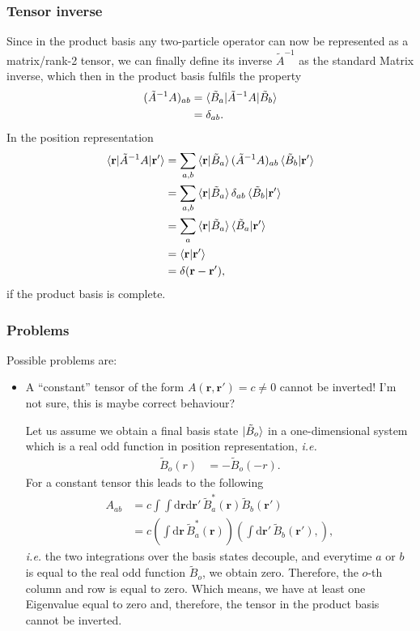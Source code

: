 \documentclass[12pt,a4paper]{scrartcl}
\numberwithin{equation}{section}
\newcommand{\cng}[1]{{\color{red}#1}}
\renewcommand{\vec}{\mathbf}
\begin{document}
\subsubsection{Tensor inverse}

Since in the product basis any two-particle operator can now be
represented as a matrix/rank-2 tensor, we can finally define its inverse $\tilde{A}^{-1}$ as the standard Matrix inverse, which then in the product basis fulfils the property
\begin{align}
 (\tilde{A}^{-1}A)_{ab}
&= \braket{ \tilde{B}_a | \tilde{A}^{-1}A | \tilde{B}_b } \\
&= \delta_{ab}.
\end{align}
In the position representation
\begin{align}
\braket{\vec{r} | \tilde{A}^{-1}A | \vec{r}' }
 &= \sum_{a,b} \braket{\vec{r}|\tilde{B}_a} (\tilde{A}^{-1}A)_{ab}\braket{\tilde{B}_b|\vec{r}'} \\
%
&= \sum_{a,b} \braket{\vec{r}|\tilde{B}_a} \delta_{ab} \braket{\tilde{B}_b|\vec{r}'} \\
&= \sum_{a} \braket{\vec{r}|\tilde{B}_a} \braket{\tilde{B}_a|\vec{r}'} \\
&= \braket{\vec{r}|\vec{r}'} \\
&= \delta(\vec{r}-\vec{r}'),
\end{align}
if the product basis is complete.


\subsubsection{Problems}
Possible problems are:
\begin{itemize}
 \item A ``constant'' tensor of the form $A(\vec{r},\vec{r}')=c\neq 0$ cannot be inverted! 
 \cng{I'm not sure, this is maybe correct behaviour?}

 Let us assume we obtain a final basis state $\ket{\tilde{B}_o}$ in a one-dimensional system
 which is a real odd function in position representation, \textit{i.e.}
 \begin{align}
  \tilde{B}_o(r) &= -\tilde{B}_o(-r).
 \end{align}
For a constant tensor this leads to the following
 \begin{align}
A_{ab}
&=c \int \int \mathrm{d}\vec{r}\mathrm{d}\vec{r}' \,  \tilde{B}^*_a(\vec{r})  \tilde{B}_b(\vec{r}') \\
&=c \left(\int \mathrm{d}\vec{r} \, \tilde{B}^*_a(\vec{r}) \right) \left( \int \mathrm{d}\vec{r}'\,  \tilde{B}_b(\vec{r}'), \right),   
\end{align}
\textit{i.e.} the two integrations over the basis states decouple, and everytime $a$ or $b$ is equal to the
real odd function $\tilde{B}_o$, we obtain zero. Therefore, the $o$-th column and row is equal to zero.
Which means, we have at least one Eigenvalue equal to zero and, therefore, the tensor
in the product basis cannot be inverted.
 
\end{itemize}
\end{document}
